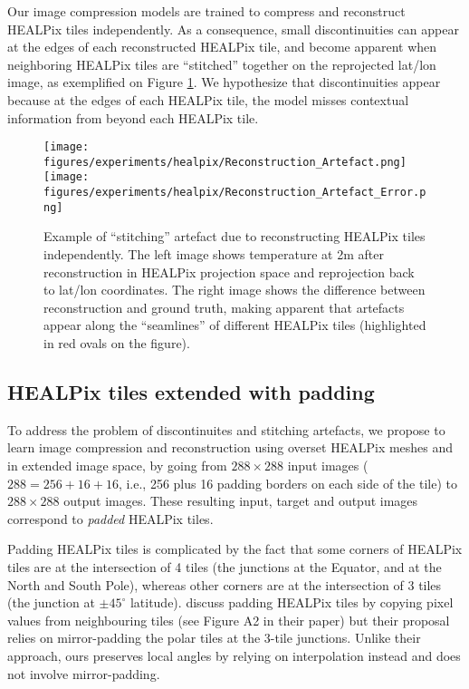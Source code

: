 Our image compression models are trained to compress and reconstruct HEALPix tiles independently. As a consequence, small discontinuities can appear at the edges of each reconstructed HEALPix tile, and become apparent when neighboring HEALPix tiles are ``stitched'' together on the reprojected lat/lon image, as exemplified on Figure \ref{fig:stitching}. We hypothesize that discontinuities appear because at the edges of each HEALPix tile, the model misses contextual information from beyond each HEALPix tile.

\begin{figure}
    \centering
    \texttt{[image: figures/experiments/healpix/Reconstruction\_Artefact.png]}
    \texttt{[image: figures/experiments/healpix/Reconstruction\_Artefact\_Error.png]}
    \hfill
    \caption{Example of ``stitching'' artefact due to reconstructing HEALPix tiles independently. The left image shows temperature at 2m after reconstruction in HEALPix projection space and reprojection back to lat/lon coordinates. The right image shows the difference between reconstruction and ground truth, making apparent that artefacts appear along the ``seamlines'' of different HEALPix tiles (highlighted in red ovals on the figure).}
    \label{fig:stitching}
\end{figure}

\subsection{HEALPix tiles extended with padding}

To address the problem of discontinuites and stitching artefacts, we propose to learn image compression and reconstruction using overset HEALPix meshes and in extended image space, by going from $288 \times 288$ input images ($288 = 256 + 16 + 16$, i.e., 256 plus 16 padding borders on each side of the tile) to $288 \times 288$ output images. These resulting input, target and output images correspond to \emph{padded} HEALPix tiles.

Padding HEALPix tiles is complicated by the fact that some corners of HEALPix tiles are at the intersection of 4 tiles (the junctions at the Equator, and at the North and South Pole), whereas other corners are at the intersection of 3 tiles (the junction at $\pm 45^\circ$ latitude). \citet{karlbauer2023advancing} discuss padding HEALPix tiles by copying pixel values from neighbouring tiles (see Figure A2 in their paper) but their proposal relies on mirror-padding the polar tiles at the 3-tile junctions. Unlike their approach, ours preserves local angles by relying on interpolation instead and does not involve mirror-padding.

